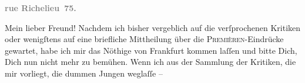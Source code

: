 \begin{ledgroupsized}[t]{13cm}
           \pstart
           \begin{otherlanguage}{french}\textcolor{gray}{\textbf{\textbf{rue Richelieu 75.}}}\end{otherlanguage}\pend
           \pstart\center{}Mein lieber Freund!\pend\pstart
           Nachdem ich bisher vergeblich auf die verſprochenen Kritiken oder wenigſtens auf eine
               briefliche Mittheilung über die \textsc{Premièren}-Eindrücke
               gewartet, habe ich mir das Nöthige von Frankfurt
               kommen laſſen und bitte Dich, Dich nun nicht mehr zu bemühen.\pend
           \pstart
           Wenn ich aus der Sammlung der Kritiken, die mir vorliegt, die dummen Jungen weglaſſe
               – \label{K_L02721-12v}
\end{ledgroupsized}
